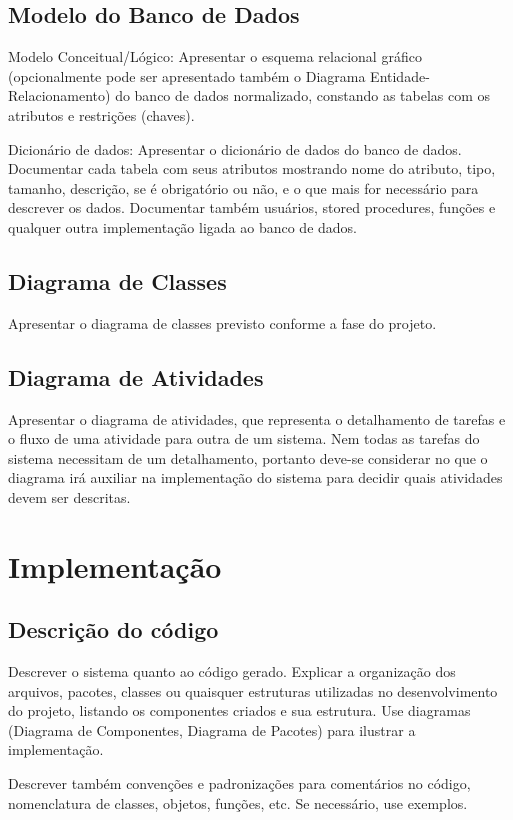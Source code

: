 \documentclass[a4paper,12pt]{article}
\begin{document}
\subsection{Modelo do Banco de Dados}
Modelo Conceitual/Lógico: Apresentar o esquema relacional gráfico (opcionalmente pode ser apresentado também o Diagrama Entidade-Relacionamento) do banco de dados normalizado, constando as tabelas com os atributos e restrições (chaves).

Dicionário de dados: Apresentar o dicionário de dados do banco de dados. Documentar cada tabela com seus atributos mostrando nome do atributo, tipo, tamanho, descrição, se é obrigatório ou não, e o que mais for necessário para descrever os dados. Documentar também usuários, stored procedures, funções e qualquer outra implementação ligada ao banco de dados.

\subsection{Diagrama de Classes}
Apresentar o diagrama de classes previsto conforme a fase do projeto.

\subsection{Diagrama de Atividades}
Apresentar o diagrama de atividades, que representa o detalhamento de tarefas e o fluxo de uma atividade para outra de um sistema. Nem todas as tarefas do sistema necessitam de um detalhamento, portanto deve-se considerar no que o diagrama irá auxiliar na implementação do sistema para decidir quais atividades devem ser descritas.

\newpage
\section{Implementação}
\subsection{Descrição do código}
Descrever o sistema quanto ao código gerado. Explicar a organização dos arquivos, pacotes, classes ou quaisquer estruturas utilizadas no desenvolvimento do projeto, listando os componentes criados e sua estrutura. Use diagramas (Diagrama de Componentes, Diagrama de Pacotes) para ilustrar a implementação.

Descrever também convenções e padronizações para comentários no código, nomenclatura de classes, objetos, funções, etc. Se necessário, use exemplos.
\end{document}
